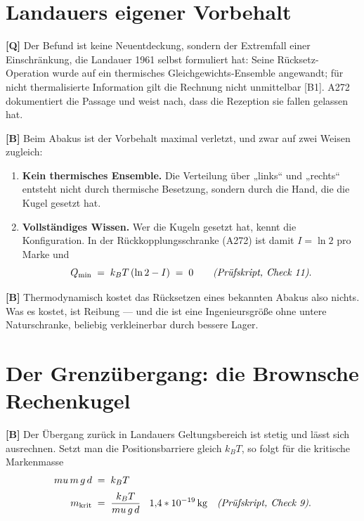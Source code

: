 \section{Landauers eigener Vorbehalt}

\textbf{[Q]} Der Befund ist keine Neuentdeckung, sondern der Extremfall einer
Einschränkung, die Landauer 1961 selbst formuliert hat: Seine Rücksetz-Operation
wurde auf ein thermisches Gleichgewichts-Ensemble angewandt; für nicht
thermalisierte Information gilt die Rechnung nicht unmittelbar [B1]. A272
dokumentiert die Passage und weist nach, dass die Rezeption sie fallen gelassen
hat.

\textbf{[B]} Beim Abakus ist der Vorbehalt maximal verletzt, und zwar auf zwei Weisen
zugleich:

\begin{enumerate}[leftmargin=1.6em,itemsep=0.3em]
  \item \textbf{Kein thermisches Ensemble.} Die Verteilung über „links“ und
        „rechts“ entsteht nicht durch thermische Besetzung, sondern durch die
        Hand, die die Kugel gesetzt hat.
  \item \textbf{Vollständiges Wissen.} Wer die Kugeln gesetzt hat, kennt die
        Konfiguration. In der Rückkopplungsschranke (A272) ist damit
        $I = \ln 2$ pro Marke und
        \begin{equation}
          Q_{\min} \;=\; k_B T\,(\ln 2 - I) \;=\; 0
          \qquad \text{\emph{(Prüfskript, Check 11)}} .
        \end{equation}
\end{enumerate}

\textbf{[B]} Thermodynamisch kostet das Rücksetzen eines bekannten Abakus also nichts. Was
es kostet, ist Reibung --- und die ist eine Ingenieursgröße ohne untere
Naturschranke, beliebig verkleinerbar durch bessere Lager.

\section{Der Grenzübergang: die Brownsche Rechenkugel}

\textbf{[B]} Der Übergang zurück in Landauers Geltungsbereich ist stetig und lässt sich
ausrechnen. Setzt man die Positionsbarriere gleich $k_BT$, so folgt für die
kritische Markenmasse
\begin{align}
  \mu\,m\,g\,d &\;=\; k_B T \notag\\[2pt]
  m_{\text{krit}} &\;=\; \frac{k_B T}{\mu\,g\,d} \;\approx\; 1{,}4\cdot10^{-19}\,\text{kg}
  \quad\text{\emph{(Prüfskript, Check 9)}} . \notag
\end{align}

